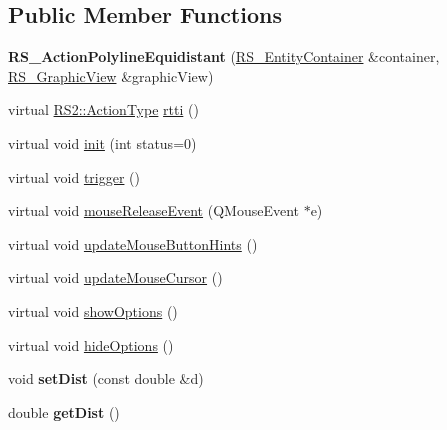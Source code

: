 \subsection*{Public Member Functions}
\begin{DoxyCompactItemize}
\item 
\hypertarget{classRS__ActionPolylineEquidistant_a58e81e7b99df5df6f241bd0f7c9cfce1}{{\bfseries R\-S\-\_\-\-Action\-Polyline\-Equidistant} (\hyperlink{classRS__EntityContainer}{R\-S\-\_\-\-Entity\-Container} \&container, \hyperlink{classRS__GraphicView}{R\-S\-\_\-\-Graphic\-View} \&graphic\-View)}\label{classRS__ActionPolylineEquidistant_a58e81e7b99df5df6f241bd0f7c9cfce1}

\item 
virtual \hyperlink{classRS2_afe3523e0bc41fd637b892321cfc4b9d7}{R\-S2\-::\-Action\-Type} \hyperlink{classRS__ActionPolylineEquidistant_a5f9aa040a1581ce1b72fa316beb4b6df}{rtti} ()
\item 
virtual void \hyperlink{classRS__ActionPolylineEquidistant_ae7affb7f36a8d0911e05543d8171e664}{init} (int status=0)
\item 
virtual void \hyperlink{classRS__ActionPolylineEquidistant_a5f0d934987fd154f79ef20d892e8fdc8}{trigger} ()
\item 
virtual void \hyperlink{classRS__ActionPolylineEquidistant_a24967ddd0bc7204c2b744f54a7fd1e3a}{mouse\-Release\-Event} (Q\-Mouse\-Event $\ast$e)
\item 
virtual void \hyperlink{classRS__ActionPolylineEquidistant_aa1d91f5988a4225f0c39905369bbad2c}{update\-Mouse\-Button\-Hints} ()
\item 
virtual void \hyperlink{classRS__ActionPolylineEquidistant_ae96e2129336e5e153eabb2bcdca90c3b}{update\-Mouse\-Cursor} ()
\item 
virtual void \hyperlink{classRS__ActionPolylineEquidistant_ab6f008df26c544dcf0e9fff7c3e41eec}{show\-Options} ()
\item 
virtual void \hyperlink{classRS__ActionPolylineEquidistant_a316e403050ae14b4ad1fe01bf0b660d0}{hide\-Options} ()
\item 
\hypertarget{classRS__ActionPolylineEquidistant_abad5c374a8621012a15734a5dd08fc22}{void {\bfseries set\-Dist} (const double \&d)}\label{classRS__ActionPolylineEquidistant_abad5c374a8621012a15734a5dd08fc22}

\item 
\hypertarget{classRS__ActionPolylineEquidistant_ab6de43827f636abd6e771f9dbd9d300c}{double {\bfseries get\-Dist} ()}\label{classRS__ActionPolylineEquidistant_ab6de43827f636abd6e771f9dbd9d300c}


\end{DoxyCompactItemize}
